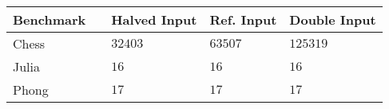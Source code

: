 
\begin{tabular}{lllll}
	Benchmark	& \phantom{Input Data}			& Halved Input	& Ref. Input	& Double Input	\\ \hline
	Chess		& \phantom{No. Tiles}			& $32403$		& $63507$		& $125319$		\\
	Julia		& \phantom{No. Iterations}		& $16$			& $16$			& $16$			\\
	Phong		& \phantom{Texture Resolution}	& $17$ 			& $17$ 			& $17$		\\
\end{tabular}
